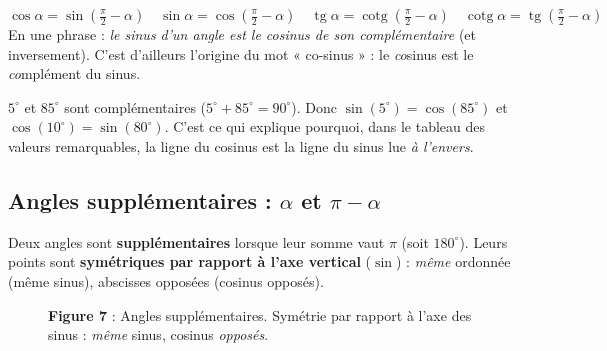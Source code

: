 \documentclass[11pt,a4paper]{article}
\DeclareMathOperator{\tg}{tg}        %
\DeclareMathOperator{\cotg}{cotg}    %
\newcommand{\degr}{^{\circ}}
\begin{document}
\begin{formule}
\[
\boxed{\cos\alpha=\sin\!\left(\tfrac{\pi}{2}-\alpha\right)}\quad
\boxed{\sin\alpha=\cos\!\left(\tfrac{\pi}{2}-\alpha\right)}\quad
\boxed{\tg\alpha=\cotg\!\left(\tfrac{\pi}{2}-\alpha\right)}\quad
\boxed{\cotg\alpha=\tg\!\left(\tfrac{\pi}{2}-\alpha\right)}
\]
En une phrase : \emph{le sinus d'un angle est le cosinus de son complémentaire} (et inversement).
C'est d'ailleurs l'origine du mot « co-sinus » : le \emph{co}sinus est le \emph{co}mplément du sinus.
\end{formule}

\begin{exemple}
$5\degr$ et $85\degr$ sont complémentaires ($5\degr+85\degr=90\degr$). Donc
$\sin(5\degr)=\cos(85\degr)$ et $\cos(10\degr)=\sin(80\degr)$. C'est ce qui explique pourquoi, dans
le tableau des valeurs remarquables, la ligne du cosinus est la ligne du sinus lue \emph{à l'envers}.
\end{exemple}

\subsection{Angles supplémentaires : $\alpha$ et $\pi-\alpha$}
Deux angles sont \textbf{supplémentaires} lorsque leur somme vaut $\pi$ (soit $180\degr$). Leurs
points sont \textbf{symétriques par rapport à l'axe vertical} ($\sin$) : \emph{même} ordonnée
(même sinus), abscisses opposées (cosinus opposés).

\begin{figure}[h]
\centering
{}
\caption*{\small\textbf{\textcolor{primary}{Figure 7}} : Angles supplémentaires. Symétrie par rapport
à l'axe des sinus : \emph{même} sinus, cosinus \emph{opposés}.}
\end{figure}
\end{document}
